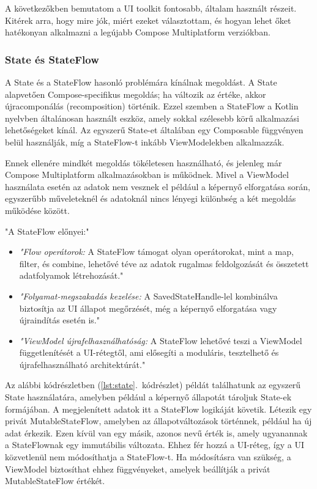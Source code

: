 A következőkben bemutatom a UI toolkit fontosabb, általam használt részeit.  
Kitérek arra, hogy mire jók, miért ezeket választottam, és hogyan lehet őket hatékonyan alkalmazni a legújabb Compose Multiplatform verziókban.

\subsubsection{State és StateFlow}
\label{sec:State}

A State és a StateFlow hasonló problémára kínálnak megoldást.  
A State alapvetően Compose-specifikus megoldás; ha változik az értéke, akkor újracomponálás (recomposition) történik.  
Ezzel szemben a StateFlow a Kotlin nyelvben általánosan használt eszköz, amely sokkal szélesebb körű alkalmazási lehetőségeket kínál.  
Az egyszerű State-et általában egy Composable függvényen belül használják, míg a StateFlow-t inkább ViewModelekben alkalmazzák.

Ennek ellenére mindkét megoldás tökéletesen használható, és jelenleg már Compose Multiplatform alkalmazásokban is működnek.  
Mivel a ViewModel használata esetén az adatok nem vesznek el például a képernyő elforgatása során, egyszerűbb műveleteknél és adatoknál nincs lényegi különbség a két megoldás működése között.

"A StateFlow előnyei:" \cite{StateVsStateFlow}
\begin{itemize}
    \item \emph{"Flow operátorok:} A StateFlow támogat olyan operátorokat, mint a map, filter, és combine, lehetővé téve az adatok rugalmas feldolgozását és összetett adatfolyamok létrehozását."
    \item \emph{"Folyamat-megszakadás kezelése:} A SavedStateHandle-lel kombinálva biztosítja az UI állapot megőrzését, még a képernyő elforgatása vagy újraindítás esetén is."
    \item \emph{"ViewModel újrafelhasználhatóság:} A StateFlow lehetővé teszi a ViewModel függetlenítését a UI-rétegtől, ami elősegíti a moduláris, tesztelhető és újrafelhasználható architektúrát."
\end{itemize}

Az alábbi kódrészletben (\ref{lst:state}.~kódrészlet) példát találhatunk az egyszerű State használatára, amelyben például a képernyő állapotát tároljuk State-ek formájában.  
A megjelenített adatok itt a StateFlow logikáját követik.  
Létezik egy privát MutableStateFlow, amelyben az állapotváltozások történnek, például ha új adat érkezik.  
Ezen kívül van egy másik, azonos nevű érték is, amely ugyanannak a StateFlownak egy immutábilis változata. Ehhez fér hozzá a UI-réteg, így a UI közvetlenül nem módosíthatja a StateFlow-t.  
Ha módosításra van szükség, a ViewModel biztosíthat ehhez függvényeket, amelyek beállítják a privát MutableStateFlow értékét.

